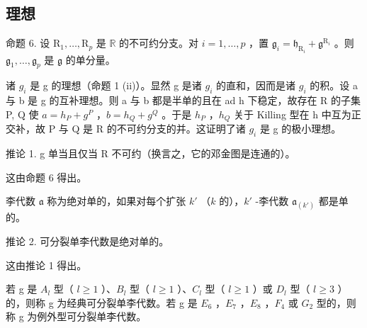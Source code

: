 \subsection{理想}

命题 6. 设 \(\mathrm{R}_1, \ldots, \mathrm{R}_p\) 是 \(\mathbb{R}\) 的不可约分支。对 \(i = 1, \ldots, p\) ，置 \(\mathfrak{g}_i = \mathfrak{h}_{\mathrm{R}_i} + \mathfrak{g}^{\mathrm{R}_i}\) 。则 \(\mathfrak{g}_1, \ldots, \mathfrak{g}_p\) 是 \(\mathfrak{g}\) 的单分量。

诸 \(g_{i}\) 是 g 的理想（命题 1 (ii)）。显然 g 是诸 \(g_{i}\) 的直和，因而是诸 \(g_{i}\) 的积。设 a 与 b 是 g 的互补理想。则 a 与 b 都是半单的且在 ad h 下稳定，故存在 R 的子集 P, Q 使 \(a = h_{P} + g^{P}\) ，\(b = h_{Q} + g^{Q}\) 。于是 \(h_{P}\) ，\(h_{Q}\) 关于 Killing 型在 h 中互为正交补，故 P 与 Q 是 R 的不可约分支的并。这证明了诸 \(g_{i}\) 是 g 的极小理想。

推论 1. g 单当且仅当 R 不可约（换言之，它的邓金图是连通的）。

这由命题 6 得出。

李代数 \(\mathfrak{a}\) 称为绝对单的，如果对每个扩张 \(k'\) （\(k\) 的），\(k'\) -李代数 \(\mathfrak{a}_{(k')}\) 都是单的。

推论 2. 可分裂单李代数是绝对单的。

这由推论 1 得出。

若 g 是 \(A_{l}\) 型（ \(l \geq 1\) ）、\(B_{l}\) 型（ \(l \geq 1\) ）、\(C_{l}\) 型（ \(l \geq 1\) ）或 \(D_{l}\) 型（ \(l \geq 3\) ）的，则称 g 为经典可分裂单李代数。若 g 是 \(E_{6}\) ，\(E_{7}\) ，\(E_{8}\) ，\(F_{4}\) 或 \(G_{2}\) 型的，则称 g 为例外型可分裂单李代数。

